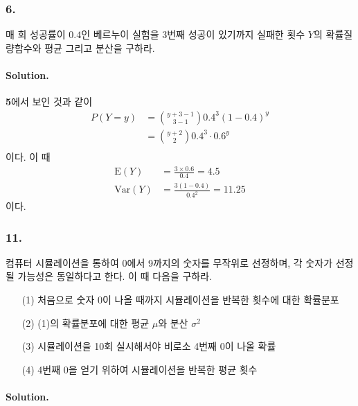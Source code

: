 \subsubsection{6.} 매 회 성공률이 $0.4$인 베르누이 실험을 $3$번째 성공이 있기까지 실패한 횟수 $Y$의 확률질량함수와 평균 그리고 분산을 구하라.

\paragraph{Solution.} \textbf{5}에서 보인 것과 같이
\begin{align*}
    P\left(Y=y\right) &= \binom{y+3-1}{3-1}0.4^3\left(1 - 0.4\right)^y\\
    &= \binom{y+2}{2}0.4^3\cdot0.6^y\\
\end{align*}
이다. 이 때
\begin{align*}
    \mathrm{E}\left(Y\right) &= \frac{3\times0.6}{0.4} = 4.5\\
    \mathrm{Var}\left(Y\right) &= \frac{3\left(1-0.4\right)}{0.4^2} = 11.25
\end{align*}
이다.

\subsubsection{11.} 컴퓨터 시뮬레이션을 통하여 0에서 9까지의 숫자를 무작위로 선정하며, 각 숫자가 선정될 가능성은 동일하다고 한다. 이 때 다음을 구하라.

\begin{itemize}
	\item [(1)] 처음으로 숫자 0이 나올 때까지 시뮬레이션을 반복한 횟수에 대한 확률분포
    \item [(2)] (1)의 확률분포에 대한 평균 $\mu$와 분산 $\sigma^2$
    \item [(3)] 시뮬레이션을 10회 실시해서야 비로소 4번째 0이 나올 확률
    \item [(4)] 4번째 0을 얻기 위하여 시뮬레이션을 반복한 평균 횟수
\end{itemize}

\paragraph{Solution.}

